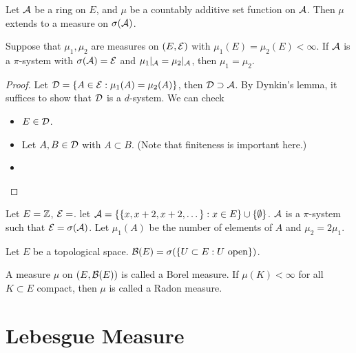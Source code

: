 \begin{theorem}
    Let $\mathcal{A}$ be a ring on $E$, and $\mu$ be a countably additive set function on $\mathcal{A}$.
    Then $\mu$ extends to a measure on $\sigma(\mathcal{A})$.
\end{theorem}

\begin{theorem}
    Suppose that $\mu_1,\mu_2$ are measures on $(E,\mathcal{E})$ with $\mu_1(E)=\mu_2(E)<\infty$.
    If $\mathcal{A}$ is a $\pi$-system with $\sigma(\mathcal{A})=\mathcal{E}$ and $\mu_1|_{\mathcal{A}}=\mu_2|_{\mathcal{A}}$, then $\mu_1=\mu_2$.
\end{theorem}
\begin{proof}
    Let $\mathcal{D}=\{A\in\mathcal{E}:\mu_1(A)=\mu_2(A)\}$, then $\mathcal{D}\supset\mathcal{A}$.
    By Dynkin's lemma, it suffices to show that $\mathcal{D}$ is a $d$-system.
    We can check 
    \begin{itemize}
        \item $E\in\mathcal{D}$.
        \item Let $A,B\in\mathcal{D}$ with $A\subset B$. (Note that finiteness is important here.)
        \item 
    \end{itemize}
\end{proof}

\begin{example}
    Let $E=\mathbb{Z}$, $\mathcal{E}=$. let $\mathcal{A}=\{\{x,x+2,x+2,\dots\}:x\in E\}\cup\{\emptyset\}$. 
    $\mathcal{A}$ is a $\pi$-system such that $\mathcal{E}=\sigma(\mathcal{A})$. Let $\mu_1(A)$ be the number of elements of $A$ and $\mu_2=2\mu_1$.
\end{example}

\begin{definition}
    Let $E$ be a topological space. 
    $\mathcal{B}(E)=\sigma(\{U\subset E:U\text{ open}\})$.
\end{definition}

\begin{definition}
    A measure $\mu$ on $(E,\mathcal{B}(E))$ is called a Borel measure. 
    If $\mu(K)<\infty$ for all $K\subset E$ compact, then $\mu$ is called a Radon measure.
\end{definition}

\section{Lebesgue Measure}


